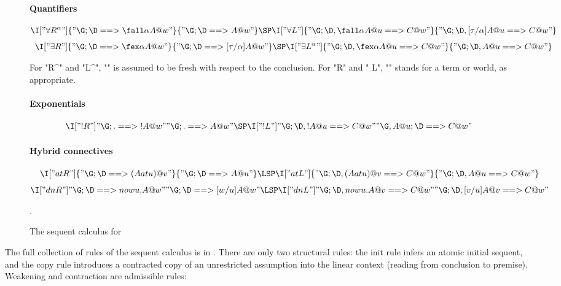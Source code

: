 \documentclass{article}
\begin{document}
\begin{figure}[p]
{\begin{minipage}{0.9\textwidth}
   \paragraph{Quantifiers}
   \begin{gather*}
     \I["\forall R^\alpha"]{"\G ; \D ==> \fall \alpha A @ w"}{"\G ; \D ==> A @ w"}
     \SP
     \I["\forall L"]{"\G ; \D, \fall \alpha A @ u ==> C @ w"}
     {"\G ; \D, [\tau / \alpha] A @ u ==> C @ w"}
     \\[1ex]
     \I["\exists R"]{"\G ; \D ==> \fex \alpha A @ w"}{"\G ; \D ==> [\tau / \alpha] A @ w"}
     \SP
     \I["\exists L^\alpha"]{"\G ; \D, \fex \alpha A @ u ==> C @ w"}
     {"\G ; \D, A @ u ==> C @ w"}
   \end{gather*}

   For "\forall R^\alpha" and "\exists L^\alpha", "\alpha" is assumed to
   be fresh with respect to the conclusion. For "\exists R" and "\forall
   L", "\tau" stands for a term or world, as appropriate.

   \paragraph{Exponentials}
   \begin{gather*}
     \I["{!}R"]{"\G ; . ==> {! A} @ w"}{"\G ; . ==> A @ w"}
     \SP
     \I["{!}L"]{"\G ; \D, {! A} @ u ==> C @ w"}{"\G, A @ u ; \D ==> C @ w"}
   \end{gather*}

   \paragraph{Hybrid connectives}

   \begin{gather*}
     \I["at R"]{"\G ; \D ==> (A at u) @ v"}{"\G ; \D ==> A @ u"}
     \LSP
     \I["at L"]{"\G ; \D, (A at u) @ v ==> C @ w"}{"\G ; \D, A @ u ==> C @ w"}
     \\[1ex]
     \I["{dn}R"]{"\G ; \D ==> now u. A @ w"}{"\G ; \D ==> [w/u] A @ w"}
     \LSP
     \I["{dn}L"]{"\G ; \D, now u. A @ v ==> C @ w"}{"\G ; \D, [v/u] A @ v ==> C @ w"}
   \end{gather*}
   \egroup
\end{minipage}}
\caption{The sequent calculus for \hyll}.
\label{fig:seq-rules}
\end{figure}

The full collection of rules of the \hyll sequent calculus is in
. There are only two structural rules: the init rule infers an
atomic initial sequent, and the copy rule introduces a contracted copy of an
unrestricted assumption into the linear context (reading from conclusion to
premise). Weakening and contraction are admissible rules:
\end{document}
